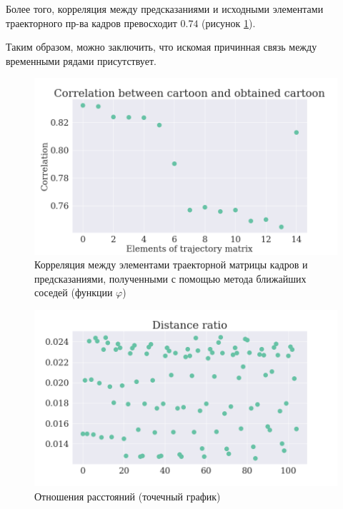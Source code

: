 \documentclass[a4paper,14pt]{article}
\theoremstyle{plain} %
\theoremstyle{definition} %
\theoremstyle{remark} %
\begin{document}
	Более того, корреляция между предсказаниями и исходными элементами траекторного пр-ва кадров превосходит $0.74$ (рисунок \ref{fig:corr_plot}).  
	
	Таким образом, можно заключить, что искомая причинная связь между временными рядами присутствует.
	
	\begin{figure}[bhtp]
		\centering
		\includegraphics[width=\linewidth]{../correlation_plot.png}
		\caption{Корреляция между элементами траекторной матрицы кадров и предсказаниями, полученными с помощью метода ближайших соседей (функции $\varphi$)}
		\label{fig:corr_plot}
	\end{figure}

	\begin{figure}[bhtp]
		\centering
		\includegraphics[width=\linewidth]{../dist_ratio_plot.png}
		\caption{Отношения расстояний (точечный график)}
		\label{fig:dist_ratio_scatter}
	\end{figure}
\end{document}
